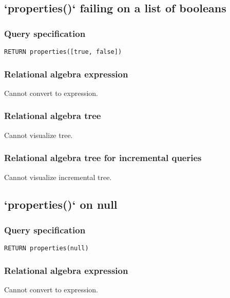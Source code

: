 \subsection{`properties()` failing on a list of booleans}

\subsubsection*{Query specification}

\begin{lstlisting}
RETURN properties([true, false])
\end{lstlisting}

\subsubsection*{Relational algebra expression}

Cannot convert to expression.

\subsubsection*{Relational algebra tree}

Cannot visualize tree.

\subsubsection*{Relational algebra tree for incremental queries}

Cannot visualize incremental tree.

\subsection{`properties()` on null}

\subsubsection*{Query specification}

\begin{lstlisting}
RETURN properties(null)
\end{lstlisting}

\subsubsection*{Relational algebra expression}

Cannot convert to expression.

